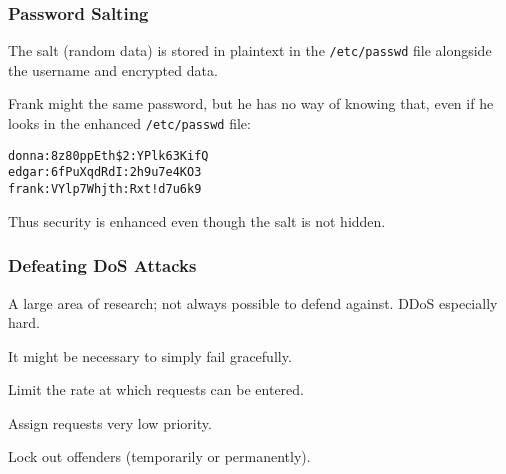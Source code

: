 \begin{frame}[fragile]
\frametitle{Password Salting}
\begin{changemargin}{1cm}

The salt (random data) is stored in plaintext in the \texttt{/etc/passwd} file alongside the username and encrypted data.

Frank might the same password, but he has no way of knowing that, even if he looks in the enhanced \texttt{/etc/passwd} file:

\begin{verbatim}
donna:8z80ppEth$2:YPlk63KifQ
edgar:6fPuXqdRdI:2h9u7e4KO3
frank:VYlp7Whjth:Rxt!d7u6k9
\end{verbatim}

Thus security is enhanced even though the salt is not hidden.

\end{changemargin}
\end{frame}




\begin{frame}
\frametitle{Defeating DoS Attacks}
\begin{changemargin}{1cm}

A large area of research; not always possible to defend against. DDoS especially hard.

It might be necessary to simply fail gracefully.

Limit the rate at which requests can be entered. 

Assign requests very low priority. 

Lock out offenders (temporarily or permanently).
\end{changemargin}
\end{frame}

